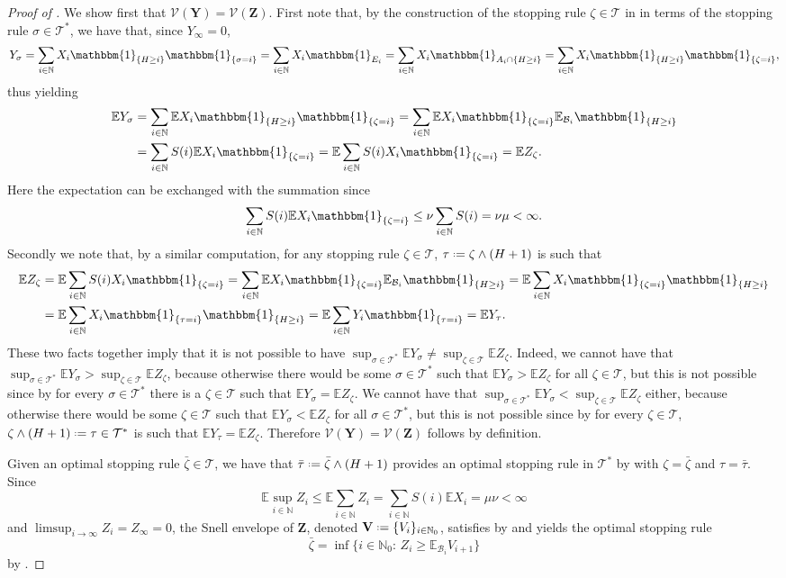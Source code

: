 \documentclass[11pt, a4paper, twoside]{article}
\newcommand*{\defeq}{\mathrel{\vcenter{\baselineskip0.5ex \lineskiplimit0pt
			\hbox{\scriptsize.}\hbox{\scriptsize.}}}=}
\newcommand{\NN}{\mathbb{N}}
\newcommand{\EE}{\mathbb{E}}
\newcommand{\TT}{\mathcal{T}}
\newcommand{\Val}{\mathcal{V}}
\newcommand{\YY}{\mathbf{Y}}
\newcommand{\VV}{\mathbf{V}}
\newcommand{\DZ}{\mathbf{Z}}
\newcommand{\DF}{\mathcal{B}}
\newcommand{\II}{\mathbbm{1}}
\numberwithin{equation}{section}
\begin{document}
\begin{proof}[Proof of ]
		We show first that $\Val(\YY)=\Val(\DZ)$. First note that, by the construction of the stopping rule $\zeta\in\TT$ in  in terms of the stopping rule $\sigma\in\TT^*$, we have that, since $Y_\infty=0$,
		\[Y_\sigma=\sum_{i\in\NN}X_i\II_{\{H\ge i\}}\II_{\{\sigma=i\}}=\sum_{i\in\NN}X_i\II_{E_i}=\sum_{i\in\NN}X_i\II_{A_i\cap\{H\ge i\}}=\sum_{i\in\NN}X_i\II_{\{H\ge i\}}\II_{\{\zeta=i\}},\]
		thus yielding
		\begin{align}\label{optequivapp'}
			\EE Y_\sigma&=\sum_{i\in\NN}\EE X_i\II_{\{H\ge i\}}\II_{\{\zeta=i\}}=\sum_{i\in\NN}\EE X_i\II_{\{\zeta=i\}}\EE_{\DF_i}\II_{\{H\ge i\}}\notag\\&=\sum_{i\in\NN}S(i)\EE X_i\II_{\{\zeta=i\}}=\EE\sum_{i\in\NN}S(i) X_i\II_{\{\zeta=i\}}=\EE Z_\zeta.
		\end{align}
		Here the expectation can be exchanged with the summation since \[\sum_{i\in\NN}S(i)\EE X_i\II_{\{\zeta=i\}}\leq\nu \sum_{i\in\NN}S(i)=\nu\mu<\infty.\] Secondly we note that, by a similar computation, for any stopping rule $\zeta\in\TT$, $\tau\defeq\zeta\wedge(H+1)$ is such that
		\begin{align}\label{optequivapp}
			\EE Z_{\zeta}&=\EE\sum_{i\in\NN}S(i) X_i\II_{\{\zeta=i\}}=\sum_{i\in\NN}\EE X_i\II_{\{\zeta=i\}}\EE_{\DF_i}\II_{\{H\ge i\}}=\EE\sum_{i\in\NN} X_i\II_{\{\zeta=i\}}\II_{\{H\ge i\}}\notag\\&=\EE\sum_{i\in\NN} X_i\II_{\{\tau=i\}}\II_{\{H\ge i\}}=\EE\sum_{i\in\NN} Y_i\II_{\{\tau=i\}}=\EE Y_{\tau}.
		\end{align}
		These two facts together imply that it is not possible to have $\sup_{\sigma\in\TT^*}\EE Y_\sigma\neq \sup_{\zeta\in\TT}\EE Z_\zeta$. Indeed, we cannot have that $\sup_{\sigma\in\TT^*}\EE Y_\sigma> \sup_{\zeta\in\TT}\EE Z_\zeta$, because otherwise there would be some $\sigma\in\TT^*$ such that $\EE Y_\sigma>\EE Z_\zeta$ for all $\zeta\in\TT$, but this is not possible since by  for every $\sigma\in\TT^*$ there is a $\zeta\in\TT$ such that $\EE Y_\sigma = \EE Z_\zeta$.  We cannot have that $\sup_{\sigma\in\TT^*}\EE Y_\sigma< \sup_{\zeta\in\TT}\EE Z_\zeta$ either, because otherwise there would be some $\zeta\in\TT$ such that $\EE Y_\sigma<\EE Z_\zeta$ for all $\sigma\in\TT^*$, but this is not possible since by  for every $\zeta\in\TT$,  $\zeta\wedge(H+1)\defeq\tau\in\TT^*$ is such that $\EE Y_\tau = \EE Z_\zeta$. Therefore $\Val(\YY)=\Val(\DZ)$ follows by definition.
		
		Given an optimal stopping rule $\bar{\zeta}\in\TT$, we have that $\bar{\tau}\defeq\bar{\zeta}\wedge(H+1)$ provides an optimal stopping rule in $\TT^*$ by  with $\zeta=\bar{\zeta}$ and $\tau=\bar{\tau}$. Since \[\EE \sup_{i\in\NN} Z_i\leq\EE\sum_{i\in\NN} Z_i = \sum_{i\in\NN}S(i)\EE X_i = \mu \nu<\infty\] and $\limsup_{i\longrightarrow\infty} Z_i=Z_\infty=0$, the Snell envelope of $\DZ$, denoted $\VV\defeq\{V_i\}_{i\in\NN_0}$, satisfies  by  and yields the optimal stopping rule \[\bar{\zeta}=\inf\{i\in\NN_0:\,Z_i\ge \EE_{\DF_i}V_{i+1}\}\]
		by .
	\end{proof}
	
\end{document}
